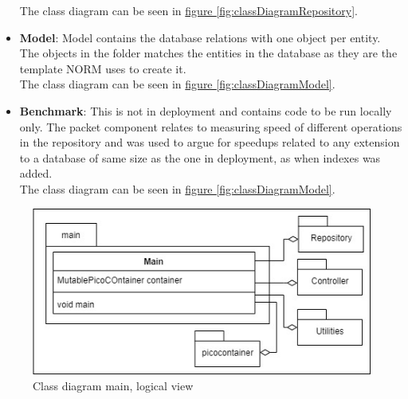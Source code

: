 \begin{itemize}
    The class diagram can be seen in \hyperref[fig:classDiagramRepository]{figure \ref{fig:classDiagramRepository}}.
    \item \textbf{Model}: Model contains the database relations with one object per entity. The objects in the folder matches the entities in the database as they are the template NORM uses to create it.\\
    The class diagram can be seen in \hyperref[fig:classDiagramModel]{figure \ref{fig:classDiagramModel}}.
    \item \textbf{Benchmark}: This is not in deployment and contains code to be run locally only. The packet component relates to measuring speed of different operations in the repository and was used to argue for speedups related to any extension to a database of same size as the one in deployment, as when indexes was added.\\
    The class diagram can be seen in \hyperref[fig:classDiagramModel]{figure \ref{fig:classDiagramModel}}.
\end{itemize}


\begin{figure}[H]
    \centering
    \includegraphics[width=1.0\textwidth]{images/class_diagram_main.jpg}
    \caption{Class diagram main, logical view}
    \label{fig:classDiagramMain}
\end{figure}

